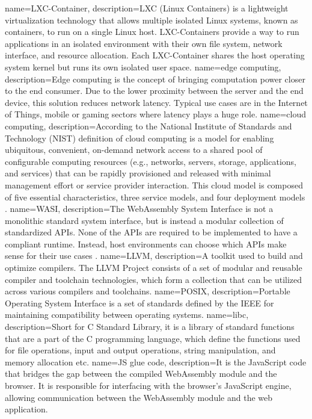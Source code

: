 {
    name=LXC-Container,
    description={LXC (Linux Containers) is a lightweight virtualization technology that allows multiple isolated Linux systems, known as containers, to run on a single Linux host. LXC-Containers provide a way to run applications in an isolated environment with their own file system, network interface, and resource allocation. Each LXC-Container shares the host operating system kernel but runs its own isolated user space.}
}
{
    name=edge computing,
    description={Edge computing is the concept of bringing computation power closer to the end consumer. Due to the lower proximity between the server and the end device, this solution reduces network latency. Typical use cases are in the Internet of Things, mobile or gaming sectors where latency plays a huge role.}
}
{
    name=cloud computing,
    description={According to the National Institute of Standards and Technology (NIST) definition of cloud computing is a model for enabling ubiquitous, convenient, on-demand network access to a shared pool of configurable computing resources (e.g., networks, servers, storage, applications, and services) that can be rapidly provisioned and released with minimal management effort or service provider interaction. This cloud model is composed of five essential characteristics, three service models, and four deployment models \cite{mell_2011_the}.}
}
{
    name=WASI,
    description={The WebAssembly System Interface is not a monolithic standard system interface, but is instead a modular collection of standardized APIs. None of the APIs are required to be implemented to have a compliant runtime. Instead, host environments can choose which APIs make sense for their use cases \cite{webassembly_2023_webassemblywasi}.}
}
{
    name=LLVM,
    description={A toolkit used to build and optimize compilers. The LLVM Project consists of a set of modular and reusable compiler and toolchain technologies, which form a collection that can be utilized across various compilers and toolchains.}
}
{
    name=POSIX,
    description={Portable Operating System Interface is a set of standards defined by the IEEE for maintaining compatibility between operating systems.}
}
{
    name=libc,
    description={Short for C Standard Library, it is a library of standard functions that are a part of the C programming language, which define the functions used for file operations, input and output operations, string manipulation, and memory allocation etc.}
}
{
    name=JS glue code,
    description={It is the JavaScript code that bridges the gap between the compiled WebAssembly module and the browser. It is responsible for interfacing with the browser's JavaScript engine, allowing communication between the WebAssembly module and the web application.}
}

\makeglossaries